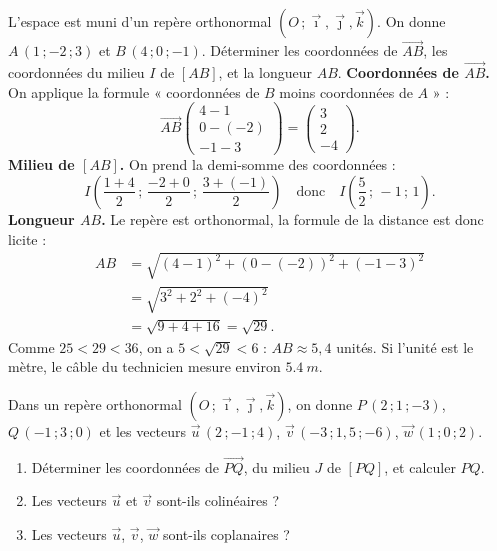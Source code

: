 \documentclass[11pt]{article}
\begin{document}
\begin{exoresolu}
L'espace est muni d'un repère orthonormal $(O\,;\vec{\imath},\vec{\jmath},\vec{k})$. On donne $A\,(1\,;-2\,;3)$ et $B\,(4\,;0\,;-1)$. Déterminer les coordonnées de $\overrightarrow{AB}$, les coordonnées du milieu $I$ de $[AB]$, et la longueur $AB$.
\tcblower
\textbf{Coordonnées de $\overrightarrow{AB}$.} On applique la formule « coordonnées de $B$ moins coordonnées de $A$ » :
\[ \overrightarrow{AB}\begin{pmatrix} 4-1 \\ 0-(-2) \\ -1-3 \end{pmatrix} = \begin{pmatrix} 3 \\ 2 \\ -4 \end{pmatrix}. \]
\textbf{Milieu de $[AB]$.} On prend la demi-somme des coordonnées :
\[ I\left(\dfrac{1+4}{2}\,;\,\dfrac{-2+0}{2}\,;\,\dfrac{3+(-1)}{2}\right) \quad\text{donc}\quad I\left(\dfrac{5}{2}\,;\,-1\,;\,1\right). \]
\textbf{Longueur $AB$.} Le repère est orthonormal, la formule de la distance est donc licite :
\begin{align*}
AB &= \sqrt{(4-1)^2+(0-(-2))^2+(-1-3)^2} \\
&= \sqrt{3^2+2^2+(-4)^2} \\
&= \sqrt{9+4+16} = \sqrt{29}.
\end{align*}
Comme $25<29<36$, on a $5<\sqrt{29}<6$ : $AB \approx 5{,}4$ unités. Si l'unité est le mètre, le câble du technicien mesure environ $\SI{5,4}{m}$.
\end{exoresolu}

\begin{exercice}
Dans un repère orthonormal $(O\,;\vec{\imath},\vec{\jmath},\vec{k})$, on donne $P\,(2\,;1\,;-3)$, $Q\,(-1\,;3\,;0)$ et les vecteurs $\vec{u}\,(2\,;-1\,;4)$, $\vec{v}\,(-3\,;1{,}5\,;-6)$, $\vec{w}\,(1\,;0\,;2)$.
\begin{enumerate}
\item Déterminer les coordonnées de $\overrightarrow{PQ}$, du milieu $J$ de $[PQ]$, et calculer $PQ$.
\item Les vecteurs $\vec{u}$ et $\vec{v}$ sont-ils colinéaires ?
\item Les vecteurs $\vec{u}$, $\vec{v}$, $\vec{w}$ sont-ils coplanaires ?
\end{enumerate}
\end{exercice}
\end{document}
